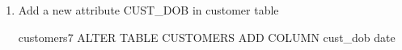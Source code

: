 \begin{enumerate}
\begin{enumerate}
          \end{enumerate}

    \item Add a new attribute CUST\_DOB in customer table

          \begin{sqlQuery}{customers7}
            ALTER TABLE CUSTOMERS
            ADD COLUMN cust_dob date
          \end{sqlQuery}

\end{enumerate}
